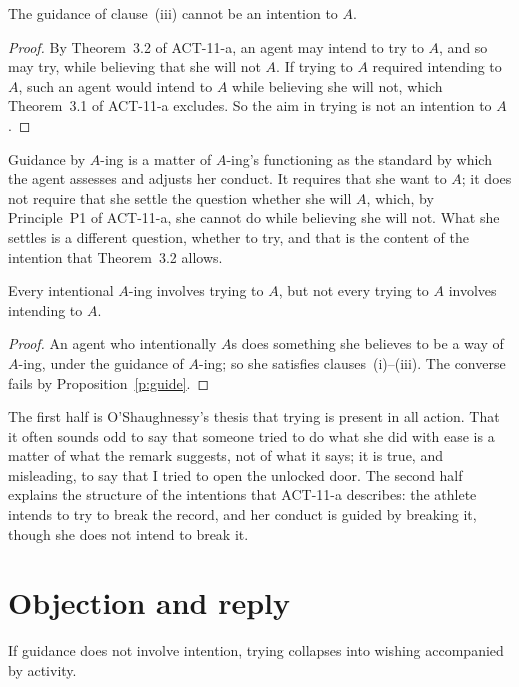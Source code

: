 \documentclass{situationist-preprint}
\begin{document}
\begin{proposition}\label{p:guide}
The guidance of clause~(iii) cannot be an intention to $A$.
\end{proposition}

\begin{proof}
By Theorem~3.2 of ACT-11-a, an agent may intend to try to $A$, and so may try, while believing that she will not $A$. If trying to $A$ required intending to $A$, such an agent would intend to $A$ while believing she will not, which Theorem~3.1 of ACT-11-a excludes. So the aim in trying is not an intention to $A$.
\end{proof}

Guidance by $A$-ing is a matter of $A$-ing's functioning as the standard by which the agent assesses and adjusts her conduct. It requires that she want to $A$; it does not require that she settle the question whether she will $A$, which, by Principle~P1 of ACT-11-a, she cannot do while believing she will not. What she settles is a different question, whether to try, and that is the content of the intention that Theorem~3.2 allows.

\begin{proposition}\label{p:ubiq}
Every intentional $A$-ing involves trying to $A$, but not every trying to $A$ involves intending to $A$.
\end{proposition}

\begin{proof}
An agent who intentionally $A$s does something she believes to be a way of $A$-ing, under the guidance of $A$-ing; so she satisfies clauses~(i)--(iii). The converse fails by Proposition~\ref{p:guide}.
\end{proof}

The first half is O'Shaughnessy's thesis that trying is present in all action. That it often sounds odd to say that someone tried to do what she did with ease is a matter of what the remark suggests, not of what it says; it is true, and misleading, to say that I tried to open the unlocked door. The second half explains the structure of the intentions that ACT-11-a describes: the athlete intends to try to break the record, and her conduct is guided by breaking it, though she does not intend to break it.

\section{Objection and reply}

\begin{objection}
If guidance does not involve intention, trying collapses into wishing accompanied by activity.
\end{objection}
\end{document}
